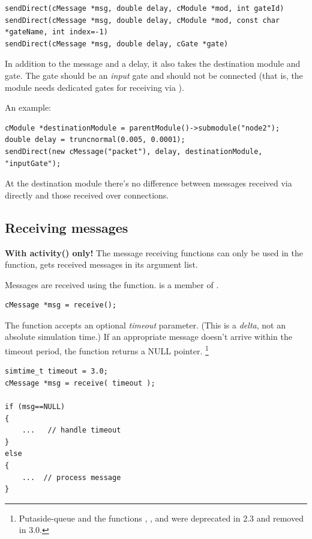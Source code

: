 \begin{verbatim}
sendDirect(cMessage *msg, double delay, cModule *mod, int gateId)
sendDirect(cMessage *msg, double delay, cModule *mod, const char *gateName, int index=-1)
sendDirect(cMessage *msg, double delay, cGate *gate)
\end{verbatim}

In addition to the message and a delay, it also takes the destination module
and gate. The gate should be an \textit{input} gate and should not be connected
(that is, the module needs dedicated gates for receiving via ).

An example:

\begin{verbatim}
cModule *destinationModule = parentModule()->submodule("node2");
double delay = truncnormal(0.005, 0.0001);
sendDirect(new cMessage("packet"), delay, destinationModule, "inputGate");
\end{verbatim}

At the destination module there's no difference between messages received
via directly and those received over connections.



\subsection{Receiving messages}

\textbf{With activity() only!} The message receiving functions can
only be used in the  function,
 gets received messages in its argument list.

Messages are received using the  function.
 is a member of .

\begin{verbatim}
cMessage *msg = receive();
\end{verbatim}

The  function accepts an optional \textit{timeout}
parameter. (This is a \textit{delta}, not an
absolute simulation time.) If an appropriate message doesn't arrive
within the timeout period, the function returns a NULL pointer.
    \footnote{Putaside-queue and the functions ,
    , and  were deprecated
    in {\opp} 2.3 and removed in {\opp} 3.0.}

\begin{verbatim}
simtime_t timeout = 3.0;
cMessage *msg = receive( timeout );

if (msg==NULL)
{
    ...   // handle timeout
}
else
{
    ...  // process message
}
\end{verbatim}



